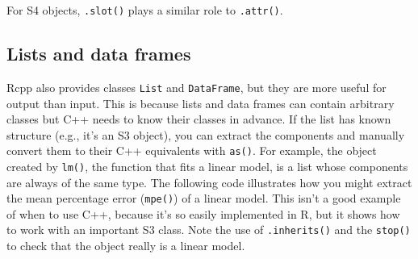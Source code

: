 \begin{Shaded}
\begin{Highlighting}[]
 

\NormalTok{, }\NormalTok{, }\NormalTok{);}

\NormalTok{, }\NormalTok{, }\NormalTok{);}
\NormalTok{) = }\NormalTok{;}
\NormalTok{) = }\NormalTok{;}

\NormalTok{\}}
\end{Highlighting}
\end{Shaded}

For S4 objects, \texttt{.slot()} plays a similar role to
\texttt{.attr()}.

\hypertarget{lists-and-data-frames}{%
\subsection{Lists and data frames}\label{lists-and-data-frames}}

Rcpp also provides classes \texttt{List} and \texttt{DataFrame}, but
they are more useful for output than input. This is because lists and
data frames can contain arbitrary classes but C++ needs to know their
classes in advance. If the list has known structure (e.g., it's an S3
object), you can extract the components and manually convert them to
their C++ equivalents with \texttt{as()}. For example, the object
created by \texttt{lm()}, the function that fits a linear model, is a
list whose components are always of the same type. The following code
illustrates how you might extract the mean percentage error
(\texttt{mpe()}) of a linear model. This isn't a good example of when to
use C++, because it's so easily implemented in R, but it shows how to
work with an important S3 class. Note the use of \texttt{.inherits()}
and the \texttt{stop()} to check that the object really is a linear
model.  


